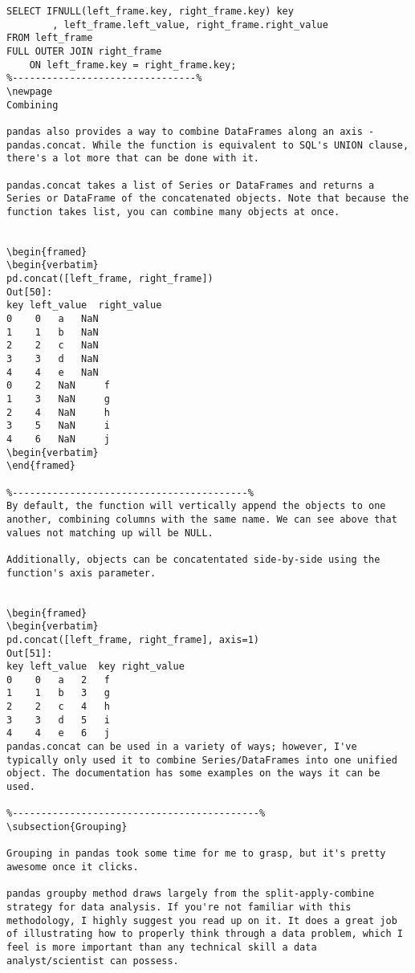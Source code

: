 \begin{framed}
\begin{verbatim}
SELECT IFNULL(left_frame.key, right_frame.key) key
        , left_frame.left_value, right_frame.right_value
FROM left_frame
FULL OUTER JOIN right_frame
    ON left_frame.key = right_frame.key;
%--------------------------------%
\newpage
Combining

pandas also provides a way to combine DataFrames along an axis - pandas.concat. While the function is equivalent to SQL's UNION clause, there's a lot more that can be done with it.

pandas.concat takes a list of Series or DataFrames and returns a Series or DataFrame of the concatenated objects. Note that because the function takes list, you can combine many objects at once.


\begin{framed}
\begin{verbatim}
pd.concat([left_frame, right_frame])
Out[50]:
key	left_value	right_value
0	 0	 a	 NaN
1	 1	 b	 NaN
2	 2	 c	 NaN
3	 3	 d	 NaN
4	 4	 e	 NaN
0	 2	 NaN	 f
1	 3	 NaN	 g
2	 4	 NaN	 h
3	 5	 NaN	 i
4	 6	 NaN	 j
\begin{verbatim}
\end{framed}

%-----------------------------------------%
By default, the function will vertically append the objects to one another, combining columns with the same name. We can see above that values not matching up will be NULL.

Additionally, objects can be concatentated side-by-side using the function's axis parameter.


\begin{framed}
\begin{verbatim}
pd.concat([left_frame, right_frame], axis=1)
Out[51]:
key	left_value	key	right_value
0	 0	 a	 2	 f
1	 1	 b	 3	 g
2	 2	 c	 4	 h
3	 3	 d	 5	 i
4	 4	 e	 6	 j
pandas.concat can be used in a variety of ways; however, I've typically only used it to combine Series/DataFrames into one unified object. The documentation has some examples on the ways it can be used.

%-------------------------------------------%
\subsection{Grouping}

Grouping in pandas took some time for me to grasp, but it's pretty awesome once it clicks.

pandas groupby method draws largely from the split-apply-combine strategy for data analysis. If you're not familiar with this methodology, I highly suggest you read up on it. It does a great job of illustrating how to properly think through a data problem, which I feel is more important than any technical skill a data analyst/scientist can possess.


\end{verbatim}
\end{framed}
